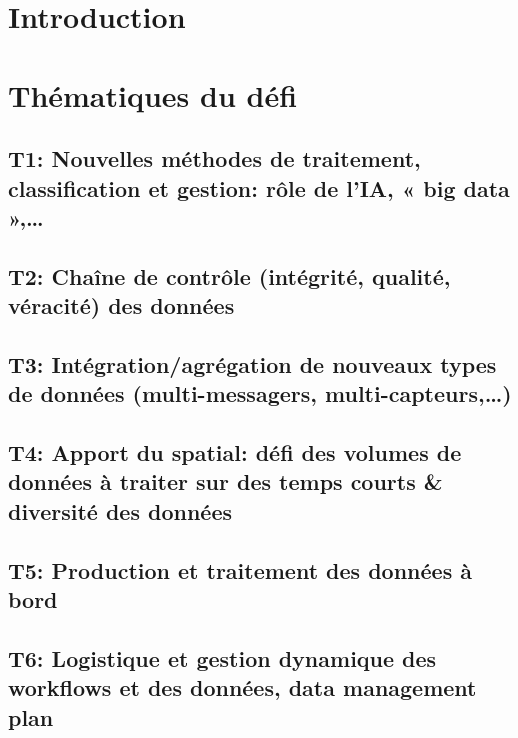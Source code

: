 \documentclass[openany, parskip=full, 12pt, a4]{scrbook}
\begin{document}
\renewcommand{\contentsname}{Table des Matières}


	


\chapter{Introduction}

\chapter{Thématiques du défi}

\section{T1: Nouvelles méthodes de traitement, classification et gestion: rôle de l’IA, « big data »,…}

\section{T2: Chaîne de contrôle (intégrité, qualité, véracité) des données}

\section{T3: Intégration/agrégation de nouveaux types de données (multi-messagers, multi-capteurs,…)}

\section{T4: Apport du spatial: défi des volumes de données à traiter sur des temps courts & diversité des données}

\section{T5: Production et traitement des données à bord}

\section{T6: Logistique et gestion dynamique des workflows et des données, data management plan}
\end{document}
